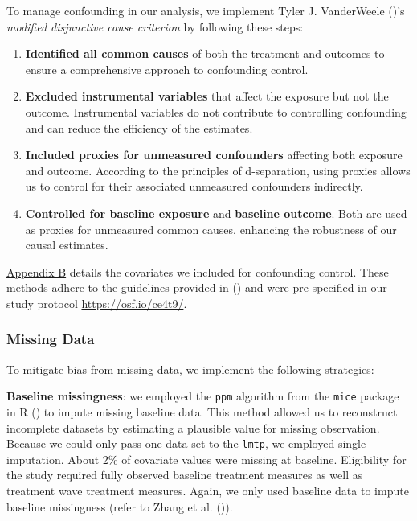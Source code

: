 \documentclass[
  single column]{article}
\providecommand{\tightlist}{%
  \setlength{\itemsep}{0pt}\setlength{\parskip}{0pt}}\usepackage{longtable,booktabs,array}
\begin{document}
To manage confounding in our analysis, we implement Tyler J. VanderWeele
()'s \emph{modified disjunctive
cause criterion} by following these steps:

\begin{enumerate}
\def\labelenumi{\arabic{enumi}.}
\tightlist
\item
  \textbf{Identified all common causes} of both the treatment and
  outcomes to ensure a comprehensive approach to confounding control.
\item
  \textbf{Excluded instrumental variables} that affect the exposure but
  not the outcome. Instrumental variables do not contribute to
  controlling confounding and can reduce the efficiency of the
  estimates.
\item
  \textbf{Included proxies for unmeasured confounders} affecting both
  exposure and outcome. According to the principles of d-separation,
  using proxies allows us to control for their associated unmeasured
  confounders indirectly.
\item
  \textbf{Controlled for baseline exposure} and \textbf{baseline
  outcome}. Both are used as proxies for unmeasured common causes,
  enhancing the robustness of our causal estimates.
\end{enumerate}

\hyperref[appendix-demographics]{Appendix B} details the covariates we
included for confounding control. These methods adhere to the guidelines
provided in () and
were pre-specified in our study protocol \url{https://osf.io/ce4t9/}.

\subsubsection{Missing Data}\label{missing-data}

To mitigate bias from missing data, we implement the following
strategies:

\textbf{Baseline missingness}: we employed the \texttt{ppm} algorithm
from the \texttt{mice} package in R () to impute missing baseline data. This method allowed us to
reconstruct incomplete datasets by estimating a plausible value for
missing observation. Because we could only pass one data set to the
\texttt{lmtp}, we employed single imputation. About 2\% of covariate
values were missing at baseline. Eligibility for the study required
fully observed baseline treatment measures as well as treatment wave
treatment measures. Again, we only used baseline data to impute baseline
missingness (refer to Zhang et al.
()).
\end{document}
